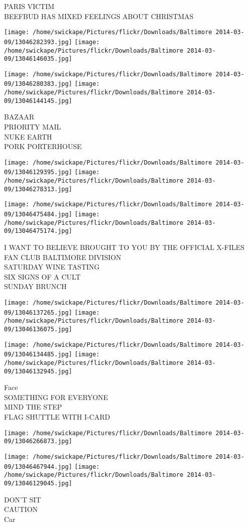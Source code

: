 \documentclass[10pt,letterpaper]{article}
\begin{document}
PARIS VICTIM\\
BEEFBUD HAS MIXED FEELINGS ABOUT CHRISTMAS\\
\pagebreak

\texttt{[image: /home/swickape/Pictures/flickr/Downloads/Baltimore 2014-03-09/13046282393.jpg]}
\texttt{[image: /home/swickape/Pictures/flickr/Downloads/Baltimore 2014-03-09/13046146035.jpg]}

\texttt{[image: /home/swickape/Pictures/flickr/Downloads/Baltimore 2014-03-09/13046280383.jpg]}
\texttt{[image: /home/swickape/Pictures/flickr/Downloads/Baltimore 2014-03-09/13046144145.jpg]}

BAZAAR\\
PRIORITY MAIL\\
NUKE EARTH\\
PORK PORTERHOUSE\\
\pagebreak

\texttt{[image: /home/swickape/Pictures/flickr/Downloads/Baltimore 2014-03-09/13046129395.jpg]}
\texttt{[image: /home/swickape/Pictures/flickr/Downloads/Baltimore 2014-03-09/13046278313.jpg]}

\texttt{[image: /home/swickape/Pictures/flickr/Downloads/Baltimore 2014-03-09/13046475484.jpg]}
\texttt{[image: /home/swickape/Pictures/flickr/Downloads/Baltimore 2014-03-09/13046475174.jpg]}

I WANT TO BELIEVE BROUGHT TO YOU BY THE OFFICIAL X{-}FILES FAN CLUB BALTIMORE DIVISION\\
SATURDAY WINE TASTING\\
SIX SIGNS OF A CULT\\
SUNDAY BRUNCH\\
\pagebreak

\texttt{[image: /home/swickape/Pictures/flickr/Downloads/Baltimore 2014-03-09/13046137265.jpg]}
\texttt{[image: /home/swickape/Pictures/flickr/Downloads/Baltimore 2014-03-09/13046136075.jpg]}

\texttt{[image: /home/swickape/Pictures/flickr/Downloads/Baltimore 2014-03-09/13046134485.jpg]}
\texttt{[image: /home/swickape/Pictures/flickr/Downloads/Baltimore 2014-03-09/13046132945.jpg]}

Face\\
SOMETHING FOR EVERYONE\\
MIND THE STEP\\
FLAG SHUTTLE WITH I{-}CARD\\
\pagebreak

\texttt{[image: /home/swickape/Pictures/flickr/Downloads/Baltimore 2014-03-09/13046266873.jpg]}

\vspace{0.25in}
\texttt{[image: /home/swickape/Pictures/flickr/Downloads/Baltimore 2014-03-09/13046467944.jpg]}
\texttt{[image: /home/swickape/Pictures/flickr/Downloads/Baltimore 2014-03-09/13046129045.jpg]}

DON'T SIT\\
CAUTION\\
Car\\
\pagebreak
\end{document}
